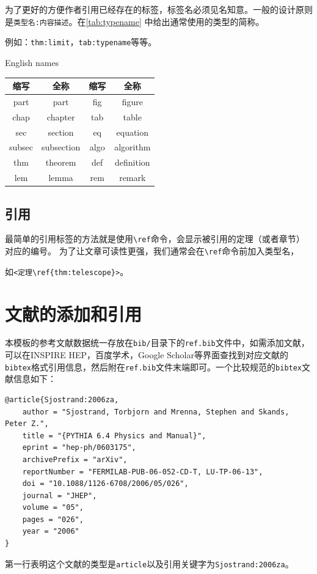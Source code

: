 为了更好的方便作者引用已经存在的标签，标签名必须见名知意。一般的设计原则是\verb|类型名:内容描述|。在\autoref{tab:typename} 中给出通常使用的类型的简称。

例如：\verb|thm:limit|，\verb|tab:typename|等等。

\begin{table}[!htp]
	\centering
	{English names}\label{tab:typename}
	\begin{tabular}{c|c|c|c}
		\hline
		缩写 & 全称 & 缩写 & 全称 \\
		 \hline %
		part & part & fig & figure \\
		chap & chapter & tab & table \\
		sec & section & eq & equation \\
		subsec & subsection & algo & algorithm \\
		thm & theorem & def & definition \\
		lem & lemma & rem & remark \\
		\hline
	\end{tabular}
\end{table}

\subsection{引用}

最简单的引用标签的方法就是使用\verb|\ref|命令，会显示被引用的定理（或者章节）对应的编号。
为了让文章可读性更强，我们通常会在\verb|\ref|命令前加入类型名，

如\verb|<定理\ref{thm:telescope}>|。

\section{文献的添加和引用}

本模板的参考文献数据统一存放在\verb|bib/|目录下的\verb|ref.bib|文件中，如需添加文献，可以在INSPIRE HEP，百度学术，Google Scholar等界面查找到对应文献的\verb|bibtex|格式引用信息，然后附在\verb|ref.bib|文件末端即可。一个比较规范的\verb|bibtex|文献信息如下：
\begin{lstlisting}
@article{Sjostrand:2006za,
    author = "Sjostrand, Torbjorn and Mrenna, Stephen and Skands, Peter Z.",
    title = "{PYTHIA 6.4 Physics and Manual}",
    eprint = "hep-ph/0603175",
    archivePrefix = "arXiv",
    reportNumber = "FERMILAB-PUB-06-052-CD-T, LU-TP-06-13",
    doi = "10.1088/1126-6708/2006/05/026",
    journal = "JHEP",
    volume = "05",
    pages = "026",
    year = "2006"
}
\end{lstlisting}
第一行表明这个文献的类型是\verb|article|以及引用关键字为\verb|Sjostrand:2006za|。


